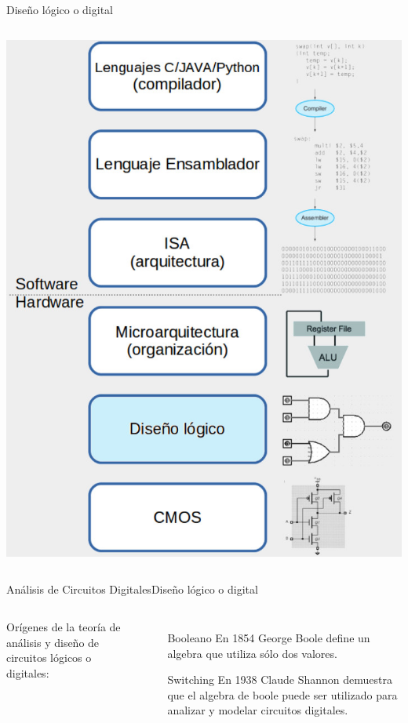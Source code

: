 \documentclass[aspectratio=169,compress]{beamer}
\begin{document}
\begin{footnotesize}
\begin{frame}{Diseño lógico o digital}
\begin{columns}[onlytextwidth,T]
      \column{60mm}
\includegraphics[scale=0.2]{images/abstraccion-logico.jpg} 

    \end{columns}
\end{frame}



\begin{frame}{Análisis de Circuitos Digitales}{Diseño lógico o digital}

\bigskip

 \begin{columns}[onlytextwidth,T]
      \column{\dimexpr\linewidth-60mm-5mm}

Orígenes de la teoría de análisis y diseño de circuitos lógicos
o digitales:
\begin{itemize}
\item[Booleano] En 1854 George Boole define un algebra que utiliza sólo dos valores.
\item[Switching] En 1938 Claude Shannon demuestra que el algebra de boole puede ser utilizado para analizar y modelar circuitos digitales.
\end{itemize}


\end{columns}
\end{frame}
\end{footnotesize}
\end{document}
